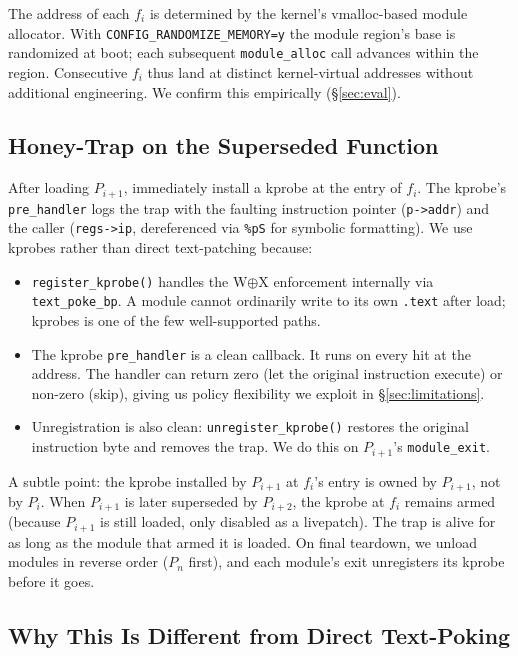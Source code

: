 \documentclass[10pt,letterpaper]{article}
\begin{document}
The address of each $f_i$ is determined by the kernel's vmalloc-based
module allocator. With \texttt{CONFIG\_RANDOMIZE\_MEMORY=y} the
module region's base is randomized at boot; each subsequent
\texttt{module\_alloc} call advances within the region. Consecutive
$f_i$ thus land at distinct kernel-virtual addresses without
additional engineering. We confirm this empirically
(\S\ref{sec:eval}).

\subsection{Honey-Trap on the Superseded Function}

After loading $P_{i+1}$, immediately install a kprobe at the entry of
$f_i$. The kprobe's \texttt{pre\_handler} logs the trap with the
faulting instruction pointer (\texttt{p->addr}) and the caller
(\texttt{regs->ip}, dereferenced via \texttt{\%pS} for symbolic
formatting). We use kprobes rather than direct text-patching because:

\begin{itemize}[leftmargin=*]
\item \texttt{register\_kprobe()} handles the W$\oplus$X enforcement
internally via \texttt{text\_poke\_bp}. A module cannot ordinarily
write to its own \texttt{.text} after load; kprobes is one of the
few well-supported paths.
\item The kprobe \texttt{pre\_handler} is a clean callback. It runs
on every hit at the address. The handler can return zero (let the
original instruction execute) or non-zero (skip), giving us policy
flexibility we exploit in \S\ref{sec:limitations}.
\item Unregistration is also clean: \texttt{unregister\_kprobe()}
restores the original instruction byte and removes the trap. We do
this on $P_{i+1}$'s \texttt{module\_exit}.
\end{itemize}

A subtle point: the kprobe installed by $P_{i+1}$ at $f_i$'s entry is
owned by $P_{i+1}$, not by $P_i$. When $P_{i+1}$ is later superseded
by $P_{i+2}$, the kprobe at $f_i$ remains armed (because $P_{i+1}$ is
still loaded, only disabled as a livepatch). The trap is alive for
as long as the module that armed it is loaded. On final teardown,
we unload modules in reverse order ($P_n$ first), and each module's
exit unregisters its kprobe before it goes.

\subsection{Why This Is Different from Direct Text-Poking}
\end{document}
